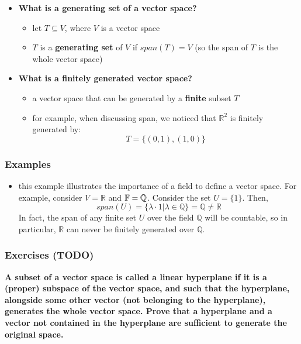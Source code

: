 \documentclass{exam}
\begin{document}
\begin{itemize}
    \item \textbf{What is a generating set of a vector space?}
    \begin{itemize}
        \item let $T \subseteq V$, where $V$ is a vector space
        \item $T$ is a \textbf{generating set} of $V$ if $span(T) = V$ (so the span  of $T$ is the whole vector space)
    \end{itemize}
    \item \textbf{What is a finitely generated vector space?}
    \begin{itemize}
        \item a vector space that can be generated by a \textbf{finite} subset $T$
        \item for example, when discussing span, we noticed that $\mathbb{R}^2$ is finitely generated by:
        \[
        T = \{(0,1), (1,0)\}
        \]
    \end{itemize}
\end{itemize}

\subsubsection{Examples}

\begin{itemize}
    \item this example illustrates the importance of a field to define a vector space. For example, consider $V = \mathbb{R}$ and $\mathbb{F} = \mathbb{Q}$. Consider the set $U = \{1\}$. Then, 
    \[
    span(U) = \{\lambda \cdot 1 | \lambda \in \mathbb{Q}\} = \mathbb{Q} \neq \mathbb{R}
    \]
    In fact, the span of any finite set $U$ over the field $\mathbb{Q}$ will be countable, so in particular, $\mathbb{R}$ can never be finitely generated over $\mathbb{Q}$.
\end{itemize}

\subsubsection{Exercises (TODO)}

\begin{questions}

\question \textbf{A subset of a vector space is called a \textbf{linear hyperplane} if it is a (proper) subspace of the vector space, and such that the hyperplane, alongside some other vector (not belonging to the hyperplane), generates the whole vector space. Prove that a hyperplane and a vector not contained in the hyperplane are sufficient to generate the original space.}

\end{questions}
\end{document}
